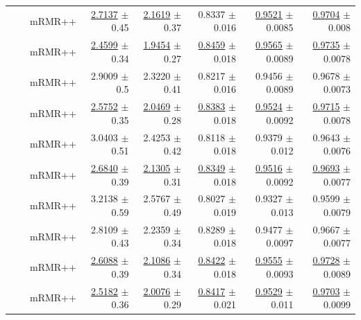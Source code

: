 \begin{longtable}{llp{}rrrrr}
 &  & mRMR++ & \underline{2.7137} {\scriptsize $\pm$ 0.45} & \underline{2.1619} {\scriptsize $\pm$ 0.37} & 0.8337 {\scriptsize $\pm$ 0.016} & \underline{0.9521} {\scriptsize $\pm$ 0.0085} & \underline{0.9704} {\scriptsize $\pm$ 0.008} \\
 &  & mRMR++ & \underline{2.4599} {\scriptsize $\pm$ 0.34} & \underline{1.9454} {\scriptsize $\pm$ 0.27} & \underline{0.8459} {\scriptsize $\pm$ 0.018} & \underline{0.9565} {\scriptsize $\pm$ 0.0089} & \underline{0.9735} {\scriptsize $\pm$ 0.0078} \\
 &  & mRMR++ & 2.9009 {\scriptsize $\pm$ 0.5} & 2.3220 {\scriptsize $\pm$ 0.41} & 0.8217 {\scriptsize $\pm$ 0.016} & 0.9456 {\scriptsize $\pm$ 0.0089} & 0.9678 {\scriptsize $\pm$ 0.0073} \\
 &  & mRMR++ & \underline{2.5752} {\scriptsize $\pm$ 0.35} & \underline{2.0469} {\scriptsize $\pm$ 0.28} & \underline{0.8383} {\scriptsize $\pm$ 0.018} & \underline{0.9524} {\scriptsize $\pm$ 0.0092} & \underline{0.9715} {\scriptsize $\pm$ 0.0078} \\
 &  & mRMR++ & 3.0403 {\scriptsize $\pm$ 0.51} & 2.4253 {\scriptsize $\pm$ 0.42} & 0.8118 {\scriptsize $\pm$ 0.018} & 0.9379 {\scriptsize $\pm$ 0.012} & 0.9643 {\scriptsize $\pm$ 0.0076} \\
 &  & mRMR++ & \underline{2.6840} {\scriptsize $\pm$ 0.39} & \underline{2.1305} {\scriptsize $\pm$ 0.31} & \underline{0.8349} {\scriptsize $\pm$ 0.018} & \underline{0.9516} {\scriptsize $\pm$ 0.0092} & \underline{0.9693} {\scriptsize $\pm$ 0.0077} \\
 &  & mRMR++ & 3.2138 {\scriptsize $\pm$ 0.59} & 2.5767 {\scriptsize $\pm$ 0.49} & 0.8027 {\scriptsize $\pm$ 0.019} & 0.9327 {\scriptsize $\pm$ 0.013} & 0.9599 {\scriptsize $\pm$ 0.0079} \\
 &  & mRMR++ & 2.8109 {\scriptsize $\pm$ 0.43} & 2.2359 {\scriptsize $\pm$ 0.34} & 0.8289 {\scriptsize $\pm$ 0.018} & 0.9477 {\scriptsize $\pm$ 0.0097} & 0.9667 {\scriptsize $\pm$ 0.0077} \\
 &  & mRMR++ & \underline{2.6088} {\scriptsize $\pm$ 0.39} & \underline{2.1086} {\scriptsize $\pm$ 0.34} & \underline{0.8422} {\scriptsize $\pm$ 0.018} & \underline{0.9555} {\scriptsize $\pm$ 0.0093} & \underline{0.9728} {\scriptsize $\pm$ 0.0089} \\
 &  & mRMR++ & \underline{2.5182} {\scriptsize $\pm$ 0.36} & \underline{2.0076} {\scriptsize $\pm$ 0.29} & \underline{0.8417} {\scriptsize $\pm$ 0.021} & \underline{0.9529} {\scriptsize $\pm$ 0.011} & \underline{0.9703} {\scriptsize $\pm$ 0.0099} \\

\end{longtable}
